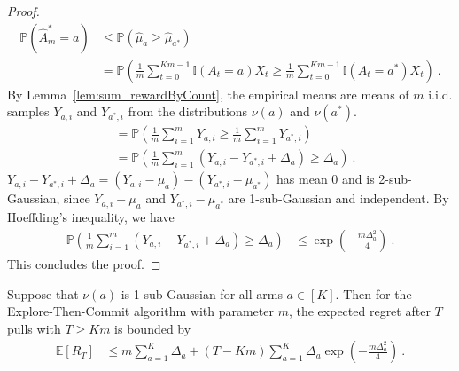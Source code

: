 \begin{proof}
\begin{align*}
  \mathbb{P}(\hat{A}_m^* = a)
  &\le \mathbb{P}(\hat{\mu}_a \ge \hat{\mu}_{a^*})
  \\
  &= \mathbb{P}\left(\frac{1}{m} \sum_{t=0}^{Km-1} \mathbb{I}(A_t = a) X_t \ge \frac{1}{m} \sum_{t=0}^{Km-1} \mathbb{I}(A_t = a^*) X_t\right)
  \: .
\end{align*}
By Lemma~\ref{lem:sum_rewardByCount}, the empirical means are means of $m$ i.i.d. samples $Y_{a,i}$ and $Y_{a^*,i}$ from the distributions $\nu(a)$ and $\nu(a^*)$.
\begin{align*}
  &= \mathbb{P}\left(\frac{1}{m} \sum_{i=1}^m Y_{a,i} \ge \frac{1}{m} \sum_{i=1}^m Y_{a^*,i}\right)
  \\
  &= \mathbb{P}\left(\frac{1}{m} \sum_{i=1}^m (Y_{a,i} - Y_{a^*,i} + \Delta_a) \ge \Delta_a\right)
  \: .
\end{align*}
$Y_{a,i} - Y_{a^*,i} + \Delta_a = (Y_{a,i} - \mu_a) - (Y_{a^*,i} - \mu_{a^*})$ has mean 0 and is 2-sub-Gaussian, since $Y_{a,i}-\mu_a$ and $Y_{a^*,i} - \mu_{a^*}$ are 1-sub-Gaussian and independent.
By Hoeffding's inequality, we have
\begin{align*}
  \mathbb{P}\left(\frac{1}{m} \sum_{i=1}^m (Y_{a,i} - Y_{a^*,i} + \Delta_a) \ge \Delta_a\right)
  &\le \exp\left(- \frac{m \Delta_a^2}{4}\right)
  \: .
\end{align*}
This concludes the proof.
\end{proof}


\begin{theorem}\label{thm:regret_etc_le}
  \leanok
Suppose that $\nu(a)$ is 1-sub-Gaussian for all arms $a \in [K]$.
Then for the Explore-Then-Commit algorithm with parameter $m$, the expected regret after $T$ pulls with $T \ge Km$ is bounded by
\begin{align*}
  \mathbb{E}[R_T]
  &\le m \sum_{a=1}^K \Delta_a + (T - Km) \sum_{a=1}^K \Delta_a \exp\left(- \frac{m \Delta_a^2}{4}\right)
  \: .
\end{align*}
\end{theorem}


